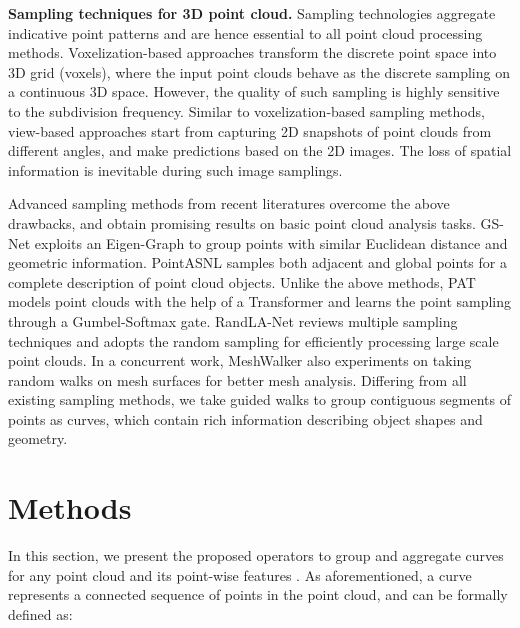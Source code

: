 \documentclass[10pt,twocolumn,letterpaper]{article}
\theoremstyle{definition}
\begin{document}
\noindent
\textbf{Sampling techniques for 3D point cloud.} Sampling technologies aggregate indicative point patterns and are hence essential to all point cloud processing methods. Voxelization-based approaches \cite{qi2016volumetric, wu2016learning, wu20153d, maturana2015voxnet} transform the discrete point space into 3D grid (voxels), where the input point clouds behave as the discrete sampling on a continuous 3D space. However, the quality of such sampling is highly sensitive to the subdivision frequency. Similar to voxelization-based sampling methods, view-based approaches \cite{su2015multi, kanezaki2016rotationnet, xie2016deepshape} start from capturing 2D snapshots of point clouds from different angles, and make predictions based on the 2D images. The loss of spatial information is inevitable during such image samplings.

Advanced sampling methods from recent literatures overcome the above drawbacks, and obtain promising results on basic point cloud analysis tasks. GS-Net \cite{xu2020geometry} exploits an Eigen-Graph to group points with similar Euclidean distance and geometric information. PointASNL \cite{yan2020pointasnl} samples both adjacent and global points for a complete description of point cloud objects. Unlike the above methods, PAT \cite{yang2019modeling} models point clouds with the help of a Transformer \cite{vaswani2017attention} and learns the point sampling through a Gumbel-Softmax gate. RandLA-Net \cite{hu2020randla} reviews multiple sampling techniques and adopts the random sampling for efficiently processing large scale point clouds. In a concurrent work, MeshWalker \cite{lahav2020meshwalker} also experiments on taking random walks on mesh surfaces for better mesh analysis. Differing from all existing sampling methods, we take guided walks to group contiguous segments of points as curves, which contain rich information describing object shapes and geometry.























\section{Methods}
In this section, we present the proposed operators to group and aggregate curves for any point cloud  and its point-wise features . As aforementioned, a curve represents a connected sequence of points in the point cloud, and can be formally defined as:
\end{document}
